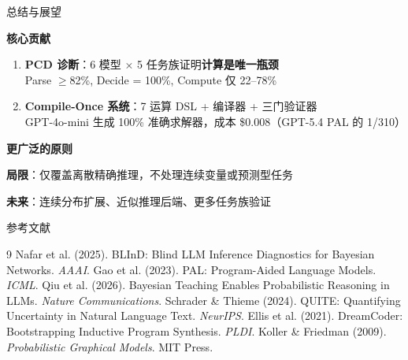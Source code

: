 \documentclass[aspectratio=169,10pt]{beamer}
\begin{document}
\begin{frame}{总结与展望}
\vspace{4pt}

\textbf{核心贡献}

\begin{enumerate}
    \item \textbf{PCD 诊断}：6 模型 × 5 任务族证明\textbf{计算是唯一瓶颈}\\
    {\small Parse $\geq$82\%, Decide = 100\%, Compute 仅 22--78\%}

    \item \textbf{Compile-Once 系统}：7 运算 DSL + 编译器 + 三门验证器\\
    {\small GPT-4o-mini 生成 100\% 准确求解器，成本 \$0.008（GPT-5.4 PAL 的 1/310）}
\end{enumerate}

\vspace{6pt}
\textbf{更广泛的原则}

\begin{center}
\end{center}

\vspace{4pt}
\textbf{局限}：仅覆盖离散精确推理，不处理连续变量或预测型任务

\textbf{未来}：连续分布扩展、近似推理后端、更多任务族验证
\end{frame}

\begin{frame}{参考文献}
\small
\begin{thebibliography}{9}
 Nafar et al. (2025). BLInD: Blind LLM Inference Diagnostics for Bayesian Networks. \textit{AAAI}.
 Gao et al. (2023). PAL: Program-Aided Language Models. \textit{ICML}.
 Qiu et al. (2026). Bayesian Teaching Enables Probabilistic Reasoning in LLMs. \textit{Nature Communications}.
 Schrader \& Thieme (2024). QUITE: Quantifying Uncertainty in Natural Language Text. \textit{NeurIPS}.
 Ellis et al. (2021). DreamCoder: Bootstrapping Inductive Program Synthesis. \textit{PLDI}.
 Koller \& Friedman (2009). \textit{Probabilistic Graphical Models}. MIT Press.
\end{thebibliography}
\end{frame}
\end{document}
